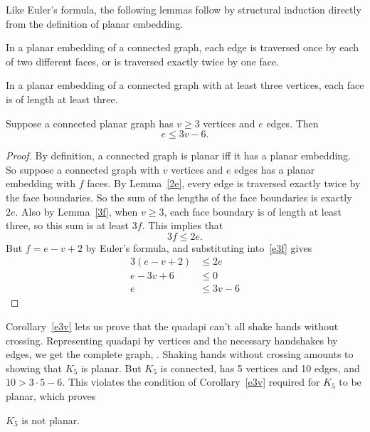 Like Euler's formula, the following lemmas follow by structural induction
directly from the definition of planar embedding.

\begin{lemma}\label{2e}
In a planar embedding of a connected graph, each edge is traversed once by
each of two different faces, or is traversed exactly twice by one face.
\end{lemma}

\begin{lemma}\label{3f}
  In a planar embedding of a connected graph with at least three vertices,
  each face is of length at least three.
\end{lemma}

\begin{corollary}\label{e3v}
Suppose a connected planar graph has $v \geq 3$ vertices and $e$ edges.
Then
\[
e \leq 3v-6.
\]
\end{corollary}

\begin{proof}
By definition, a connected graph is planar iff it has a planar embedding.
So suppose a connected graph with $v$ vertices and $e$ edges has a planar
embedding with $f$ faces.  By Lemma~\ref{2e}, every edge is traversed
exactly twice by the face boundaries.  So the sum of the lengths of the
face boundaries is exactly $2e$.  Also by Lemma~\ref{3f}, when $v \geq 3$,
each face boundary is of length at least three, so this sum is at least
$3f$.  This implies that
\begin{equation}\label{e3f}
3f \leq 2e.
\end{equation}
But $f = e-v+2$ by Euler's formula, and substituting into~\eqref{e3f} gives
\begin{align*}
3(e-v+2) & \leq 2e\\
e-3v + 6  & \leq 0\\
e & \leq 3v - 6
\end{align*}
\end{proof}

Corollary~\ref{e3v} lets us prove that the quadapi can't all shake hands
without crossing.  Representing quadapi by vertices and the necessary
handshakes by edges, we get the complete graph, .  Shaking
hands without crossing amounts to showing that $K_5$ is planar.  But $K_5$
is connected, has 5 vertices and 10 edges, and $10 > 3 \cdot 5-6$.  This
violates the condition of Corollary~\ref{e3v} required for $K_5$ to be
planar, which proves

\begin{lemma}\label{k5not}
$K_5$ is not planar.
\end{lemma}

